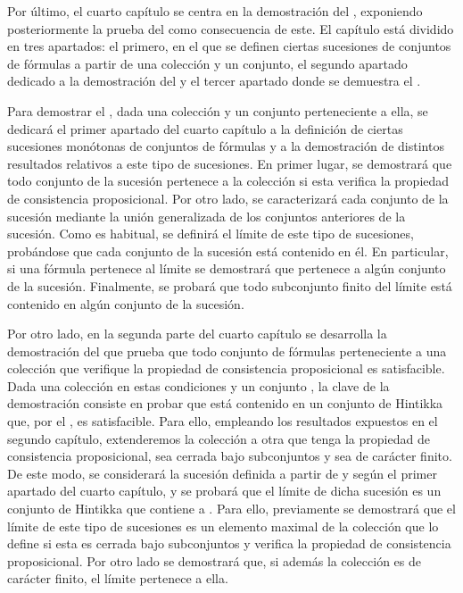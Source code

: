 \begin{isabellebody}
\begin{isamarkuptext}
  Por último, el cuarto capítulo se centra en la demostración del , exponiendo posteriormente la prueba del  como consecuencia de este. El capítulo está dividido en tres apartados: 
  el primero, en el que se definen ciertas sucesiones de conjuntos de fórmulas a partir de 
  una colección y un conjunto, el segundo apartado dedicado a la demostración del 
   y el tercer apartado donde se demuestra el 
  . 

  Para demostrar el , dada una colección
  y un conjunto perteneciente a ella, se dedicará el primer apartado del cuarto capítulo 
  a la definición de ciertas sucesiones monótonas de conjuntos de fórmulas y a la 
  demostración de distintos resultados relativos a este tipo de sucesiones. En primer 
  lugar, se demostrará que todo conjunto de la sucesión pertenece a la colección si esta 
  verifica la propiedad de consistencia proposicional. Por otro lado, se caracterizará 
  cada conjunto de la sucesión mediante la unión generalizada de los conjuntos anteriores 
  de la sucesión. Como es habitual, se definirá el límite de este tipo de sucesiones, 
  probándose que cada conjunto de la sucesión está contenido en él. En particular, si una 
  fórmula pertenece al límite se demostrará que pertenece a algún conjunto de la sucesión. 
  Finalmente, se probará que todo subconjunto finito del límite está contenido en algún 
  conjunto de la sucesión.

  Por otro lado, en la segunda parte del cuarto capítulo se desarrolla la demostración del
   que prueba que todo conjunto de fórmulas
  perteneciente a una colección que verifique la propiedad de consistencia proposicional 
  es satisfacible. Dada una colección  en estas condiciones y un conjunto , 
  la clave de la demostración consiste en probar que  está contenido en un conjunto de 
  Hintikka que, por el , es satisfacible. Para ello, empleando los 
  resultados expuestos en el segundo capítulo, extenderemos la colección  a otra  
  que tenga la propiedad de consistencia proposicional, sea cerrada bajo subconjuntos y 
  sea de carácter finito. De este modo, se considerará la sucesión definida a partir de 
   y  según el primer apartado del cuarto capítulo, y se probará que el límite de dicha 
  sucesión es un conjunto de Hintikka que contiene a . Para ello, previamente se 
  demostrará que el límite de este tipo de sucesiones es un elemento maximal de la
  colección que lo define si esta es cerrada bajo subconjuntos y verifica la propiedad de
  consistencia proposicional. Por otro lado se demostrará que, si además la colección es 
  de carácter finito, el límite pertenece a ella.


\end{isamarkuptext}
\end{isabellebody}
